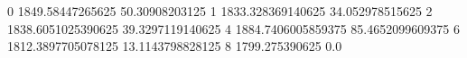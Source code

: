 0 1849.58447265625 50.30908203125
1 1833.328369140625 34.052978515625
2 1838.6051025390625 39.3297119140625
4 1884.7406005859375 85.4652099609375
6 1812.3897705078125 13.1143798828125
8 1799.275390625 0.0
